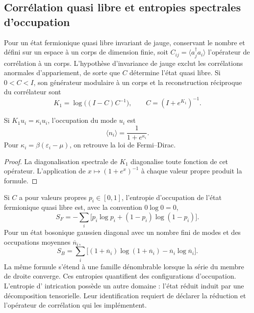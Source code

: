 \subsection{Corrélation quasi libre et entropies spectrales d’occupation}

Pour un état fermionique quasi libre invariant de jauge, conservant le
nombre et défini sur un espace à un corps de dimension finie, soit
\(C_{ij}=\langle a_j^\dagger a_i\rangle\) l’opérateur de corrélation à un
corps. L’hypothèse d’invariance de jauge exclut les corrélations anormales
d’appariement, de sorte que \(C\) détermine l’état quasi libre. Si
\(0<C<I\), son générateur modulaire à un corps et la reconstruction réciproque
du corrélateur sont
\begin{equation}
 \boxed{
 K_1=\log\bigl((I-C)C^{-1}\bigr),
 \qquad
 C=(I+e^{K_1})^{-1}.}
 \label{eq:puente-cuasilibre-modular-rev3}
\end{equation}

\begin{corollary}
\label{cor:forma-logistica-modular-rev3}
Si \(K_1u_i=\kappa_i u_i\), l’occupation du mode \(u_i\) est
\[
 \langle n_i\rangle=\frac1{1+e^{\kappa_i}}.
\]
Pour \(\kappa_i=\beta(\varepsilon_i-\mu)\), on retrouve la loi de
Fermi--Dirac.
\end{corollary}

\begin{proof}
La diagonalisation spectrale de \(K_1\) diagonalise toute fonction de cet opérateur.
L’application de \(x\mapsto(1+e^x)^{-1}\) à chaque valeur propre produit la formule.
\end{proof}

Si \(C\) a pour valeurs propres \(p_i\in[0,1]\), l’entropie d’occupation de
l’état fermionique quasi libre est, avec la convention \(0\log0=0\),
\begin{equation}
 S_F=-\sum_i\bigl[p_i\log p_i+(1-p_i)\log(1-p_i)\bigr].
 \label{eq:entropia-cuasilibre-fermi-rev3}
\end{equation}
Pour un état bosonique gaussien diagonal avec un nombre fini de modes et
des occupations moyennes \(\overline n_i\),
\begin{equation}
 S_B=\sum_i\bigl[(1+\overline n_i)\log(1+\overline n_i)
                  -\overline n_i\log\overline n_i\bigr].
 \label{eq:entropia-gaussiana-bose-rev3}
\end{equation}
La même formule s'étend à une famille dénombrable lorsque la série du
membre de droite converge.
Ces entropies quantifient des configurations d'occupation. L'entropie d'
intrication possède un autre domaine : l'état réduit induit par une
décomposition tensorielle. Leur identification requiert de déclarer la
réduction et l'opérateur de corrélation qui les implémentent.

